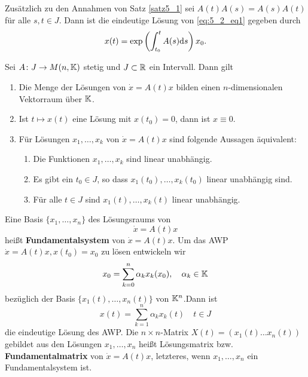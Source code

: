 \begin{kor}\label{kor5_2}
	Zusätzlich zu den Annahmen von Satz \ref{satz5_1} sei $A(t)A(s) = A(s)A(t)$ für alle $s,t \in J$. Dann ist die eindeutige Lösung von \eqref{eq:5_2_eq1} gegeben durch
	\[x(t) = \exp\left(\int_{t_0}^{t} A(s) \mathrm{d} s\right)x_0.\]
\end{kor}
\begin{satz}\label{satz5_3}
	Sei $A \colon J \to M(n, \mathbb{K})$ stetig und $J \subset \mathbb{R}$ ein Intervall. Dann gilt
	\begin{enumerate}[label=(\alph*)]
		\item Die Menge der Lösungen von $\dot{x} = A(t)x$ bilden einen $n$-dimensionalen Vektorraum über $\mathbb{K}$.
		\item Ist $t \mapsto x(t)$ eine Lösung mit $x(t_0) = 0$, dann ist $x \equiv 0$.
		\item Für Lösungen $x_1, \dots, x_k$ von $\dot{x}= A(t)x$ sind folgende Aussagen äquivalent:
		\begin{enumerate}[label=(\roman*)]
			\item Die Funktionen $x_1, \dots, x_k$ sind linear unabhängig.
			\item Es gibt ein $t_0 \in J$, so dass $x_1(t_0), \dots, x_k(t_0)$ linear unabhängig sind.
			\item Für alle $t \in J$ sind $x_1(t), \dots, x_k(t)$ linear unabhängig.
		\end{enumerate}
	\end{enumerate}
\end{satz}
Eine Basis $\{x_1, \dots, x_n\}$ des Lösungsraums von
\[\dot{x}= A(t) x\]
heißt \textbf{Fundamentalsystem} von $\dot{x}= A(t) x$. Um das AWP $\dot{x}= A(t) x, x(t_0) = x_0$ zu lösen entwickeln wir
\begin{equation}\label{eq:5_2_eq4}
	x_0 = \sum_{k=0}^n \alpha_k x_k(x_0), \quad \alpha_k \in \mathbb{K}
\end{equation}
bezüglich der Basis $\{x_1(t), \dots, x_n(t)\}$ von $\mathbb{K}^n$.Dann ist
\begin{equation}\label{eq:5_2_eq5}
	x(t) = \sum_{k=1}^n \alpha_k x_k (t) \quad t \in J
\end{equation}
die eindeutige Lösung des AWP. Die $n \times n$-Matrix $X(t) = (x_1(t) \dots x_n(t))$ gebildet aus den Lösungen $x_1, \dots, x_n$ heißt Lösungsmatrix bzw. \textbf{Fundamentalmatrix} von $\dot{x} = A(t) x$, letzteres, wenn $x_1, \dots, x_n$ ein Fundamentalsystem ist. 

